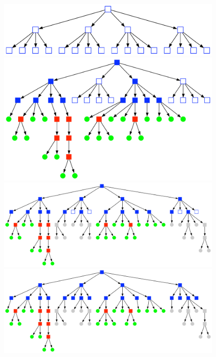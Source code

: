 \begin{figure}[htbp]
\begin{center}
\includegraphics[scale=0.35]{07quadtree50_TPL2_stage1.pdf}\\ \vspace{1.0cm}
\includegraphics[scale=0.35]{07quadtree50_TPL2_stage2a.pdf}\\
\includegraphics[scale=0.35]{07quadtree50_TPL2_stage2b.pdf}\\
\includegraphics[scale=0.35]{07quadtree50_TPL2_stage3.pdf}\\

\end{center}
\end{figure}
